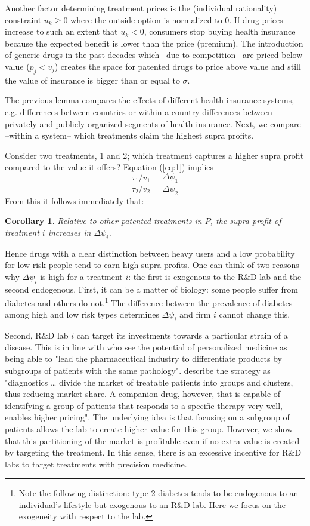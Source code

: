 \documentclass[12pt,english,a4paper]{article}
\newtheorem{corollary}{Corollary}
\begin{document}
Another factor determining treatment prices is the (individual rationality) constraint \(u_k \geq 0\) where the outside option is normalized to 0. If drug prices increase to such an extent that \(u_k < 0\), consumers stop buying health insurance because the expected benefit is lower than the price (premium). The introduction of generic drugs in the past decades which --due to competition-- are priced below value (\(p_j < v_j\)) creates the space for patented drugs to price above value and still the value of insurance is bigger than or equal to \(\sigma\).

The previous lemma compares the effects of different health insurance systems, e.g. differences between countries or within a country differences between privately and publicly organized segments of health insurance. Next, we compare --within a system-- which treatments claim the highest supra profits.

Consider two treatments, 1 and 2; which treatment captures a higher supra profit compared to the value it offers? Equation (\ref{eq:1}) implies
\begin{equation}
\label{eq:42}
\frac{\tau_1/v_1}{\tau_2/v_2} = \frac{\Delta \psi_1}{\Delta \psi_2}
\end{equation}
From this it follows immediately that:
\begin{corollary}\label{lem:TwoPart}
Relative to other patented treatments in $P$, the supra profit of treatment $i$ increases in $\Delta \psi_i$.
\end{corollary}

Hence drugs with a clear distinction between heavy users and a low probability for low risk people tend to earn high supra profits. One can think of two reasons why \(\Delta \psi_i\) is high for a treatment \(i\): the first is exogenous to the R\&D lab and the second endogenous. First, it can be a matter of biology: some people suffer from diabetes and others do not.\footnote{Note the following distinction: type 2 diabetes tends to be endogenous to an individual's lifestyle but exogenous to an R\&D lab. Here we focus on the exogeneity with respect to the lab.} The difference between the prevalence of diabetes among high and low risk types determines \(\Delta \psi_i\) and firm \(i\) cannot change this.

Second, R\&D lab \(i\) can target its investments towards a particular strain of a disease. This is in line with \cite{Garattini2015} who see the potential of personalized medicine as being able to "lead the pharmaceutical industry to differentiate products by subgroups of patients with the same pathology". \cite{jakka13_econom_persp_person_medic} describe the strategy as "diagnostics \ldots{} divide the market of treatable patients into groups and clusters, thus reducing market share. A companion drug, however, that is capable of identifying a group of patients that responds to a specific therapy very well, enables higher pricing". The underlying idea is that focusing on a subgroup of patients allows the lab to create higher value for this group. However, we show that this partitioning of the market is profitable even if no extra value is created by targeting the treatment. In this sense, there is an excessive incentive for R\&D labs to target treatments with precision medicine.
\end{document}
